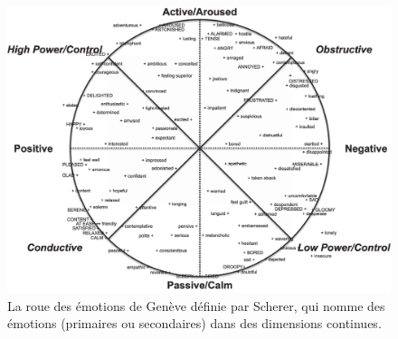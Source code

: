 \begin{figure}
  \centering
  \includegraphics[width=18cm]{./Chapitre1/figures/Genova.png}
  \caption{La roue des émotions de Genève définie par Scherer, qui nomme des émotions (primaires ou secondaires) dans des dimensions continues.}
  \label{fig:Genova}
\end{figure}
